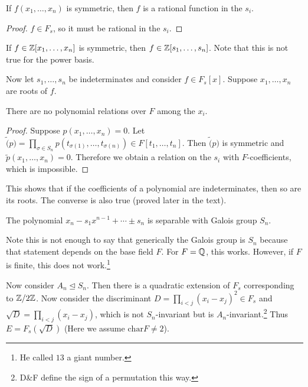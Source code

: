 \documentclass[10pt, twoside]{article}
\begin{document}
        \begin{cor} If $f(x_1, \ldots, x_n)$ is symmetric, then $f$ is a
            rational function in the $s_i$.  \begin{proof} $f \in F_s$, so it
            must be rational in the $s_i$.  \end{proof} \end{cor}

        \begin{rmk} If $f \in \mathbb{Z}[x_1, \ldots, x_n]$ is symmetric, then $f \in
        \mathbb{Z}[s_1, \ldots, s_n]$. Note that this is not true for the power basis.
    \end{rmk}

        Now let $s_1, \ldots, s_n$ be indeterminates and consider $f \in
        F_s[x]$. Suppose $x_1, \ldots, x_n$ are roots of $f$. 

        \begin{prop} There are no polynomial relations over $F$ among the
            $x_i$.  \begin{proof} Suppose $p(x_1, \ldots, x_n) = 0$. Let
                $\widetilde(p) = \prod_{\sigma \in S_n} p(t_{\sigma(1)},
                \ldots, t_{\sigma(n)}) \in F[t_1, \ldots, t_n]$. Then
                $\widetilde(p)$ is symmetric and $\widetilde{p}(x_1, \ldots,
                x_n) = 0$. Therefore we obtain a relation on the $s_i$ with
                $F$-coefficients, which is impossible.  \end{proof} \end{prop}

        This shows that if the coefficients of a polynomial are indeterminates,
        then so are its roots. The converse is also true (proved later in the
        text).

        \begin{thm} The polynomial $x_n - s_1x^{n-1} + \cdots \pm s_n$ is
        separable with Galois group $S_n$.  \end{thm}

        Note this is not enough to say that generically the Galois group is
        $S_n$ because that statement depends on the base field $F$. For $F =
        \mathbb{Q}$, this works. However, if $F$ is finite, this does not
        work.\footnote{He called $13$ a giant number.}

        Now consider $A_n \trianglelefteq S_n$. Then there is a quadratic
        extension of $F_s$ corresponding to $\mathbb{Z}/2\mathbb{Z}$. Now consider the
        discriminant $D = \prod_{i<j} (x_i-x_j)^2 \in F_s$ and $\sqrt{D} =
        \prod_{i<j} (x_i-x_j)$, which is not $S_n$-invariant but is
        $A_n$-invariant.\footnote{D\&F define the sign of a permutation this
        way.} Thus $E = F_s(\sqrt{D})$ (Here we assume $\mathrm{char} F \neq
        2$). 
\end{document}
